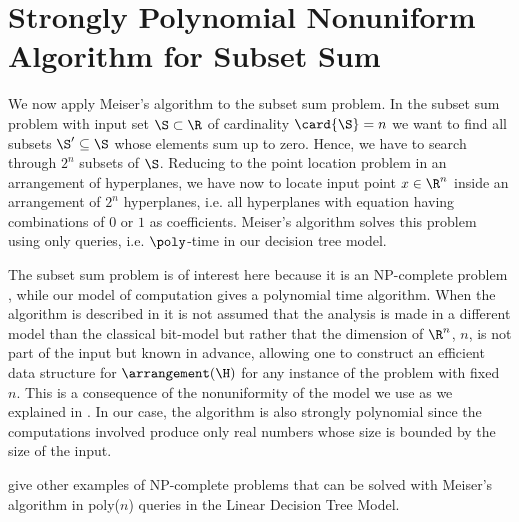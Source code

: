 \section[Strongly Polynomial Nonuniform Algorithm \dots]{Strongly Polynomial Nonuniform Algorithm for Subset Sum}

We now apply Meiser's algorithm to the subset sum problem. In the subset sum
problem with input set $\S \subset \R$ of cardinality $\card{\S} = n$ we want to
find all subsets $\S' \subseteq \S$ whose elements sum up to zero. Hence, we have
to search through $2^n$ subsets of $\S$. Reducing to the point location problem
in an arrangement of hyperplanes, we have now to locate input point $x \in
\R^n$ inside an arrangement of $2^n$ hyperplanes, i.e. all hyperplanes with
equation having combinations of $0$ or $1$ as coefficients. Meiser's algorithm
solves this problem using only  queries, i.e. $\poly$-time
in our decision tree model.

The subset sum problem is of interest here because it is an NP-complete problem
\cite{karp:1972}, while our model of computation gives a polynomial time
algorithm. When the algorithm is described in \cite{burgisser:1997} it is not
assumed that the analysis is made in a different model than the classical
bit-model but rather that the dimension of $\R^n$, $n$, is not part of the input
but known in advance, allowing one to construct an efficient data structure for
$\arrangement(\H)$ for any instance of the problem with fixed $n$.
This is a consequence of the nonuniformity of the model we use as we explained
in . In our case, the algorithm is
also strongly polynomial since the computations involved produce only real
numbers whose size is bounded by the size of the input.

\citet*{meiser:1993,burgisser:1997} give other examples of
NP-complete problems that can be solved with Meiser's algorithm in poly(\(n\))
queries in the Linear Decision Tree Model.
